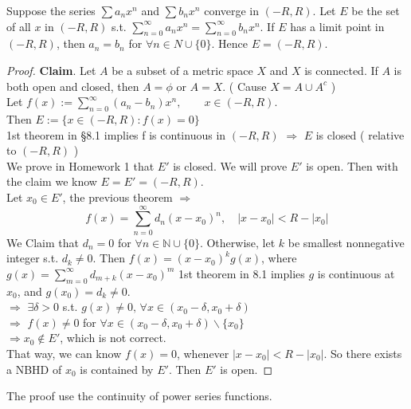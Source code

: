 \begin{theorem}
    Suppose the series  $ \sum a_n x^n  $ and  $ \sum b_nx^n $ converge in  $ (-R,R) $.
    Let  $ E  $ be the set of all  $ x $ in  $ (-R,R) $ s.t.  $ \sum\limits_{n=0}^{\infty} a_nx^n=\sum\limits_{n=0}^{\infty} b_nx^n $. If  $ E  $ has a limit point in  $ (-R,R) $,  then  $ a_n=b_n $ for  $ \forall n\in N \cup\{0\} $.
    Hence  $ E=(-R,R) $.     
\end{theorem}
\begin{proof}
    \textbf{Claim}. Let  $ A  $ be a subset  of a metric space  $ X  $ and  $ X  $ is connected. If  $ A  $ is both open and closed, then  $ A=\phi $  or  $ A=X $. ( Cause  $ X=A\cup A^c $ )\\
    Let  $ f(x):=\sum\limits_{n=0}^{\infty} (a_n-b_n)x^n,\qquad x\in (-R,R) $.\\
    Then  $ E:=\{x\in(-R,R):f(x)=0\} $ \\
    1st theorem in \S 8.1 implies f is continuous in  $ (-R,R) $  $ \Rightarrow $  $ E  $ is closed ( relative to  $ (-R,R) $ )\\
    We prove in Homework 1 that  $ E' $ is closed. We will prove  $ E' $ is open. Then with the claim we know  $ E=E'=(-R,R) $.\\
    Let  $ x_0\in E'  $, the previous theorem  $ \Rightarrow $
    \[f(x)=\sum\limits_{n=0}^{\infty} d_n(x-x_0)^n,\quad |x-x_0|<R-|x_0|\]
    We Claim that  $ d_n=0  $ for  $ \forall n\in \mathbb{N }\cup \{0\} $. Otherwise, let  $ k  $ be smallest nonnegative   integer s.t.  $ d_k\not=0 $. Then  $ f(x)=(x-x_0)^kg(x) $, where  $ g(x)=\sum\limits_{m=0 }^{\infty} d_{m+k}(x-x_0)^m $
    1st theorem in 8.1 implies   $ g  $ is continuous at  $ x_0  $, and  $ g(x_0)=d_k\not=0 $. \\
     $ \Rightarrow $  $ \exists \delta>0  $ s.t.  $ g(x)\not=0,\,\forall x\in (x_0-\delta,x_0+\delta) $\\
      $ \Rightarrow  $ $ f(x)\not=0 $ for  $ \forall x\in (x_0-\delta,x_0+\delta)\backslash\{x_0\} $\\   
      $ \Rightarrow x_0\not\in E' $, which is not correct.\\
      That way, we can know  $ f(x)=0 $, whenever  $ |x-x_0|<R-|x_0| $. So there exists a NBHD of  $ x_0 $ is contained by  $ E'  $. Then     $ E' $ is open.      
    
\end{proof}
\begin{remark}
     The proof use the continuity of power series functions.
\end{remark}
